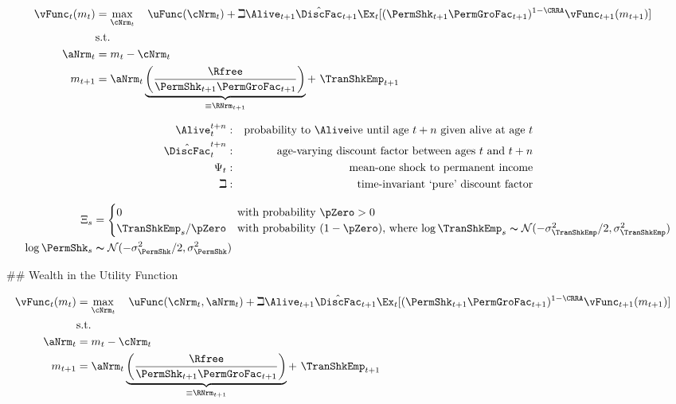 \begin{align}
    {\vFunc}_{t}({m}_{t}) & = \max_{\cNrm_{t}}~~~ \uFunc(\cNrm_{t})+\beth\Alive_{t+1}\hat{\DiscFac}_{t+1}
    \Ex_{t}[(\PermShk_{t+1}\PermGroFac_{t+1})^{1-\CRRA}{\vFunc}_{t+1}({m}_{t+1})]                                     \\
                          & \text{s.t.}                                                                   & \nonumber \\
    \aNrm_{t}             & = {m}_{t}-\cNrm_{t} \nonumber
    \\ {m}_{t+1} & = \aNrm_{t}\underbrace{\left(\frac{\Rfree}{\PermShk_{t+1}\PermGroFac_{t+1}}\right)}_{\equiv \RNrm_{t+1}}+ ~\TranShkEmp_{t+1}
\end{align}

\begin{align}
    \Alive _{t}^{t+n} & : & \text{probability to }\Alive\text{ive until age $t+n$ given alive at age $t$}
    \\ \hat{\DiscFac}_{t}^{t+n} &:&\text{age-varying discount factor between ages $t$ and $t+n$}
    \\ \Psi_{t} &:&\text{mean-one shock to permanent income}
    \\ \beth &:&\text{time-invariant `pure' discount factor}
\end{align}

\begin{align}
    \Xi_{s}           & =
    \begin{cases}
        0\phantom{/\pZero}     & \text{with probability $\pZero>0$}                                                                                                            \\
        \TranShkEmp_{s}/\pZero & \text{with probability $(1-\pZero)$, where $\log \TranShkEmp_{s}\thicksim \mathcal{N}(-\sigma_{\TranShkEmp}^{2}/2,\sigma_{\TranShkEmp}^{2})$} \\
    \end{cases} \\
    \log \PermShk_{s} & \thicksim \mathcal{N}(-\sigma_{\PermShk}^{2}/2,\sigma_{\PermShk}^{2})
\end{align}

## Wealth in the Utility Function

\begin{align}
    {\vFunc}_{t}({m}_{t}) & = \max_{\cNrm_{t}}~~~ \uFunc(\cNrm_{t}, \aNrm_{t})+\beth\Alive_{t+1}\hat{\DiscFac}_{t+1}
    \Ex_{t}[(\PermShk_{t+1}\PermGroFac_{t+1})^{1-\CRRA}{\vFunc}_{t+1}({m}_{t+1})]                                                \\
                          & \text{s.t.}                                                                              & \nonumber \\
    \aNrm_{t}             & = {m}_{t}-\cNrm_{t} \nonumber
    \\ {m}_{t+1} & = \aNrm_{t}\underbrace{\left(\frac{\Rfree}{\PermShk_{t+1}\PermGroFac_{t+1}}\right)}_{\equiv \RNrm_{t+1}}+ ~\TranShkEmp_{t+1}
\end{align}

